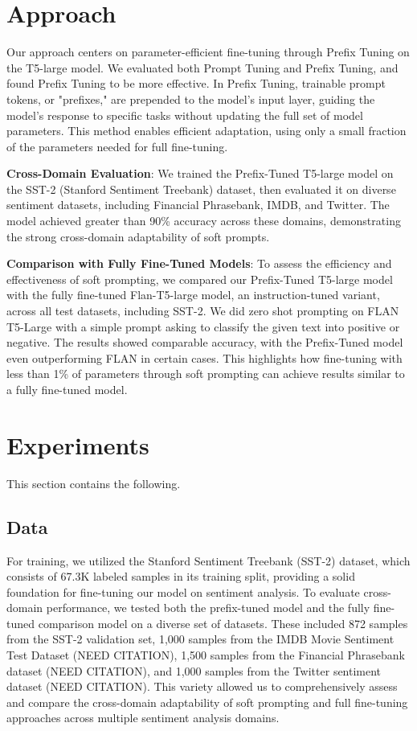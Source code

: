 \documentclass{article}
\begin{document}
\section{Approach}
Our approach centers on parameter-efficient fine-tuning through Prefix Tuning on the T5-large model. We evaluated both Prompt Tuning and Prefix Tuning, and found Prefix Tuning to be more effective. In Prefix Tuning, trainable prompt tokens, or "prefixes," are prepended to the model's input layer, guiding the model’s response to specific tasks without updating the full set of model parameters. This method enables efficient adaptation, using only a small fraction of the parameters needed for full fine-tuning.

\textbf{Cross-Domain Evaluation}: We trained the Prefix-Tuned T5-large model on the SST-2 (Stanford Sentiment Treebank) dataset, then evaluated it on diverse sentiment datasets, including Financial Phrasebank, IMDB, and Twitter. The model achieved greater than 90\% accuracy across these domains, demonstrating the strong cross-domain adaptability of soft prompts.

\textbf{Comparison with Fully Fine-Tuned Models}: To assess the efficiency and effectiveness of soft prompting, we compared our Prefix-Tuned T5-large model with the fully fine-tuned Flan-T5-large model, an instruction-tuned variant, across all test datasets, including SST-2. We did zero shot prompting on FLAN T5-Large with a simple prompt asking to classify the given text into positive or negative. The results showed comparable accuracy, with the Prefix-Tuned model even outperforming FLAN in certain cases. This highlights how fine-tuning with less than 1\% of parameters through soft prompting can achieve results similar to a fully fine-tuned model.


\section{Experiments}
This section contains the following.

\subsection{Data}
For training, we utilized the Stanford Sentiment Treebank (SST-2) dataset, which consists of 67.3K labeled samples in its training split, providing a solid foundation for fine-tuning our model on sentiment analysis. To evaluate cross-domain performance, we tested both the prefix-tuned model and the fully fine-tuned comparison model on a diverse set of datasets. These included 872 samples from the SST-2 validation set, 1,000 samples from the IMDB Movie Sentiment Test Dataset (NEED CITATION), 1,500 samples from the Financial Phrasebank dataset (NEED CITATION), and 1,000 samples from the Twitter sentiment dataset (NEED CITATION). This variety allowed us to comprehensively assess and compare the cross-domain adaptability of soft prompting and full fine-tuning approaches across multiple sentiment analysis domains.
\end{document}
